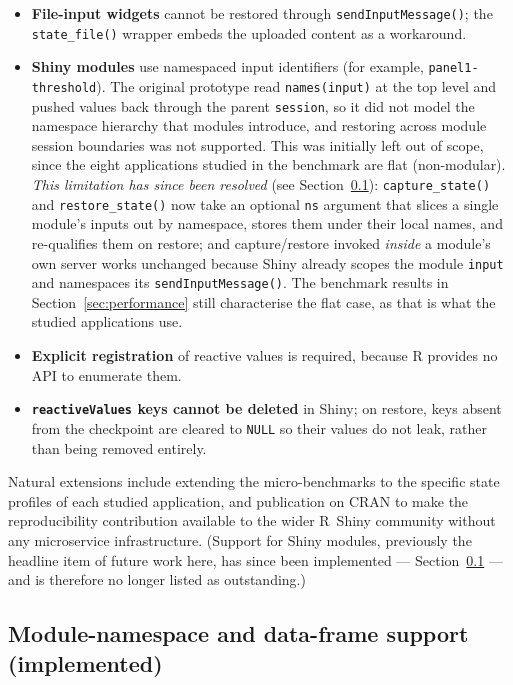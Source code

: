 \documentclass[11pt,a4paper]{article}
\begin{document}
\begin{itemize}
  \item \textbf{File-input widgets} cannot be restored through
    \texttt{sendInputMessage()}; the \texttt{state\_file()} wrapper embeds the
    uploaded content as a workaround.
  \item \textbf{Shiny modules} use namespaced input identifiers (for example,
    \texttt{panel1-threshold}). The original prototype read \texttt{names(input)}
    at the top level and pushed values back through the parent \texttt{session},
    so it did not model the namespace hierarchy that modules introduce, and
    restoring across module session boundaries was not supported. This was
    initially left out of scope, since the eight applications studied in the
    benchmark are flat (non-modular). \emph{This limitation has since been
    resolved} (see Section~\ref{sec:module-support}): \texttt{capture\_state()}
    and \texttt{restore\_state()} now take an optional \texttt{ns} argument that
    slices a single module's inputs out by namespace, stores them under their
    local names, and re-qualifies them on restore; and capture/restore invoked
    \emph{inside} a module's own server works unchanged because Shiny already
    scopes the module \texttt{input} and namespaces its \texttt{sendInputMessage()}.
    The benchmark results in Section~\ref{sec:performance} still characterise the
    flat case, as that is what the studied applications use.
  \item \textbf{Explicit registration} of reactive values is required, because R
    provides no API to enumerate them.
  \item \textbf{\texttt{reactiveValues} keys cannot be deleted} in Shiny; on
    restore, keys absent from the checkpoint are cleared to \texttt{NULL} so
    their values do not leak, rather than being removed entirely.
\end{itemize}

Natural extensions include extending the micro-benchmarks to the specific state
profiles of each studied application, and publication on CRAN to make the
reproducibility contribution available to the wider R~Shiny community without any
microservice infrastructure. (Support for Shiny modules, previously the headline
item of future work here, has since been implemented ---
Section~\ref{sec:module-support} --- and is therefore no longer listed as
outstanding.)

\subsection{Module-namespace and data-frame support (implemented)}
\label{sec:module-support}
\end{document}

